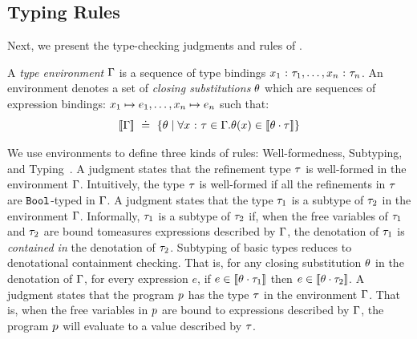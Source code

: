 \subsection{Typing Rules}

%
Next, we present the type-checking
judgments and rules of \corelan.

A \emph{type environment} $\Gamma$ is a sequence of type bindings
${x_1} \ \text{:}\ {\tau_1},\ldots,{x_n} \ \text{:}\ {\tau_n}$. An environment
denotes a set of \emph{closing substitutions} $\theta$ which are
sequences of expression bindings:
${x_1} \mapsto {e_1}, \ldots, {x_n} \mapsto {e_n}$ such that:
$$
[\![\Gamma]\!] \ \doteq\   \{\theta \mid \forall {x} \ \text{:}\ {\tau} \in \Gamma.
                                    \theta(x) \in [\![{\theta} \cdot {\ensuremath{\tau}} ]\!] \}
$$

We use environments to define three kinds of
rules: Well-formedness, Subtyping,
and Typing~\citep{Knowles10,Vazou14}.
%
A judgment \iswellformed{\env}{\typ} states that
the refinement type $\tau$ is well-formed in
the environment $\Gamma$.
%
Intuitively, the type $\tau$ is well-formed if all
the refinements in $\tau$ are $\texttt{Bool}$-typed in $\Gamma$.
%
A judgment  states
that the type $\tau_1$ is a subtype of %
$\tau_2$ in the environment $\Gamma$.
%
Informally, $\tau_1$ is a subtype of $\tau_2$ if, when
the free variables of $\tau_1$ and $\tau_2$
are bound tomeasures expressions described by $\Gamma$,
the denotation of $\tau_1$
is \emph{contained in} the denotation of $\tau_2$.
%
Subtyping of basic types reduces to denotational containment checking.
%
%
That is, for any closing substitution $\theta$
in the denotation of $\Gamma$, for every expression $e$,
if $e \in \interp{\applysub{\sto}{\typ_1}}$ then
$ e \in \interp{\applysub{\sto}{\typ_2}}$.
%
A judgment \hastype{\env}{\prog}{\typ} states that
the program $p$ has the type $\tau$ in
the environment $\Gamma$.
That is, when the free variables in $p$ are
bound to expressions described by $\Gamma$, the
program $p$ will evaluate to a value
described by $\tau$.

